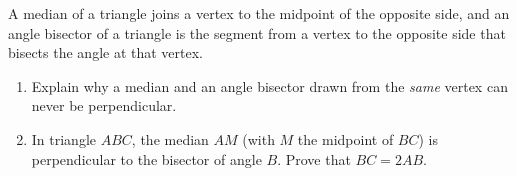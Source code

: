 A median of a triangle joins a vertex to the midpoint of the opposite side, and an angle bisector of a triangle is the segment from a vertex to the opposite side that bisects the angle at that vertex.
\begin{enumerate}
\item[(a)] Explain why a median and an angle bisector drawn from the \emph{same} vertex can never be perpendicular.
\item[(b)] In triangle $ABC$, the median $AM$ (with $M$ the midpoint of $BC$) is perpendicular to the bisector of angle $B$. Prove that $BC=2AB$.
\end{enumerate}
